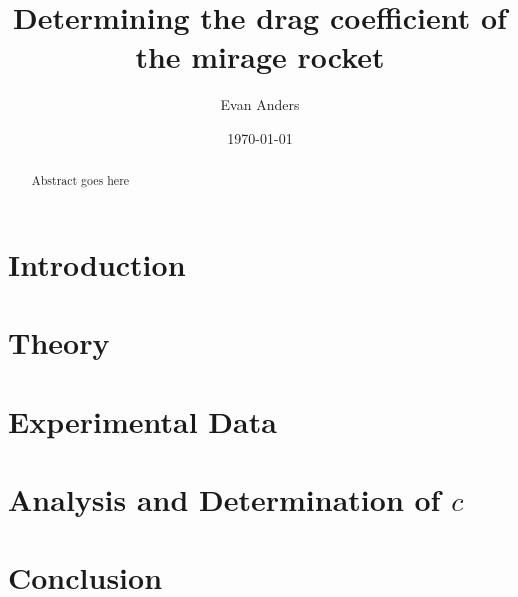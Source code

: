 \documentclass[aps,pra,twocolumn]{revtex4-1}
\begin{document}
\title{Determining the drag coefficient of the mirage rocket}

\author{Evan Anders}


\date{\today}

\begin{abstract}
Abstract goes here
\end{abstract}



\maketitle


\section{\label{section1} Introduction}




\section{\label{section 2} Theory}




\section{\label{section 3} Experimental Data}




\section{\label{section 4} Analysis and Determination of $c$}




\section{\label{section 5} Conclusion}



\end{document}
